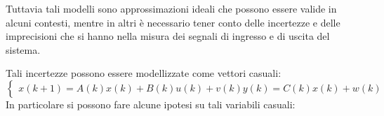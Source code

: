 \documentclass[12pt,a4paper]{article}
\begin{document}
Tuttavia tali modelli sono approssimazioni ideali che possono essere valide in alcuni contesti, mentre in altri è necessario tener conto delle incertezze e delle imprecisioni che si hanno nella misura dei segnali di ingresso e di uscita del sistema.

Tali incertezze possono essere modellizzate come vettori casuali:
\[
\begin{cases}
x(k+1) = A(k)x(k) + B(k)u(k) + v(k)
y(k) = C(k)x(k) + w(k)
\end{cases}
\]
In particolare si possono fare alcune ipotesi su tali variabili casuali:
\end{document}
